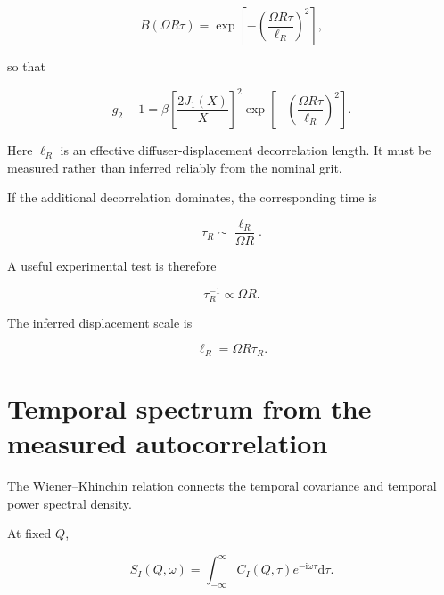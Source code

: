 \documentclass[11pt]{article}
\renewcommand{\dd}{\mathrm{d}}
\newcommand{\ii}{\mathrm{i}}
\begin{document}
\begin{equation}
    B(\Omega R\tau)
    =
    \exp\left[
        -\left(
            \frac{\Omega R\tau}{\ell_R}
        \right)^2
    \right],
\end{equation}

so that

\begin{equation}
\boxed{
    g_2-1
    =
    \beta
    \left[
        \frac{2J_1(X)}{X}
    \right]^2
    \exp\left[
        -\left(
            \frac{\Omega R\tau}{\ell_R}
        \right)^2
    \right].
}
\label{eq:offaxis_gaussian}
\end{equation}

Here $\ell_R$ is an effective diffuser-displacement decorrelation length. It
must be measured rather than inferred reliably from the nominal grit.

If the additional decorrelation dominates, the corresponding time is

\begin{equation}
    \tau_R
    \sim
    \frac{\ell_R}{\Omega R}.
\end{equation}

A useful experimental test is therefore

\begin{equation}
    \tau_R^{-1}\propto\Omega R.
\end{equation}

The inferred displacement scale is

\begin{equation}
    \boxed{
    \ell_R
    =
    \Omega R\tau_R.
    }
\end{equation}

\section{Temporal spectrum from the measured autocorrelation}

The Wiener--Khinchin relation connects the temporal covariance and temporal
power spectral density.

At fixed $Q$,

\begin{equation}
    S_I(Q,\omega)
    =
    \int_{-\infty}^{\infty}
    C_I(Q,\tau)
    e^{-\ii\omega\tau}
    \dd\tau.
    \label{eq:temporal_WK}
\end{equation}
\end{document}
